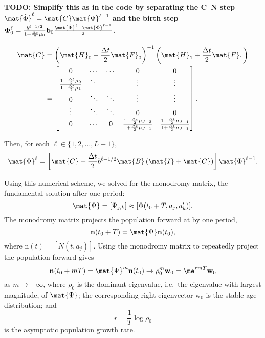 \documentclass{jpmarticle}
\renewcommand{\vec}[1]{\boldsymbol{\mathrm{#1}}}
\let\subequationsorig\subequations%
\let\endsubequationsorig\endsubequations%
\renewenvironment{subequations}{
  \subequationsorig
  \renewcommand{\theequation}{\theparentequation.\arabic{equation}}
}{
  \endsubequationsorig
}
\begin{document}
\textbf{TODO: Simplify this as in the code by separating the C–N step
  $\mat{\hat{\Phi}}^{\ell} = \mat{C} \mat{\Phi}^{\ell - 1}$
  and the birth step
  $\vec{\Phi}_0^{\ell} =
  \frac{b^{\ell - 1 / 2}}{1 + \frac{\Delta t}{2} \mu_0} \vec{b}_0
  \frac{\mat{\hat{\Phi}}^{\ell} + \mat{\hat{\Phi}}^{\ell - 1}}{2}$.}
\begin{subequations}
  \begin{align}
    \begin{split}
      \mat{C}
      &= \left(\mat{H}_0
        - \frac{\Delta t}{2} \mat{F}_0\right)^{-1}
      \left(\mat{H}_1
        + \frac{\Delta t}{2} \mat{F}_1\right)
      \\
      &=
      \begin{bmatrix}
        0 & \cdots & \cdots & 0 & 0
        \\
        \frac{1 - \frac{\Delta t}{2} \mu_0}
        {1 + \frac{\Delta t}{2} \mu_1}
        & \ddots & & \vdots & \vdots
        \\
        0 & \ddots & \ddots & \vdots & \vdots
        \\
        \vdots & \ddots & \ddots & 0 & 0
        \\
        0 & \cdots & 0 &
        \frac{1 - \frac{\Delta t}{2} \mu_{J - 2}}
        {1 + \frac{\Delta t}{2} \mu_{J - 1}}
        & \frac{1 - \frac{\Delta t}{2} \mu_{J - 1}}
        {1 + \frac{\Delta t}{2} \mu_{J - 1}}
      \end{bmatrix}.
    \end{split}
  \end{align}
\end{subequations}
Then, for each $\ell \in \{1, 2, \ldots, L - 1\}$,
\begin{equation}
  \mat{\Phi}^{\ell}
  =
  \left[\mat{C}
    +  \frac{\Delta t}{2} b^{\ell - 1 / 2} \mat{B}
    \left(\mat{I} + \mat{C}\right)
  \right]
  \mat{\Phi}^{\ell - 1}.
\end{equation}

Using this numerical scheme, we solved for the monodromy matrix, the
fundamental solution after one period:
\begin{equation}
  \mat{\Psi} = [\Psi_{j, k}] \approx [\Phi(t_0 + T, a_j, a'_k)].
\end{equation}
The monodromy matrix projects the population forward at by one period,
\begin{equation}
  \vec{n}(t_0 + T) = \mat{\Psi} \vec{n}(t_0),
\end{equation}
where $\vec{n}(t) = [N(t, a_j)]$.
Using the monodromy matrix to repeatedly project the population
forward gives
\begin{equation}
  \vec{n}(t_0 + m T)
  = \mat{\Psi}^m \vec{n}(t_0)
  \to \rho_0^m \vec{w}_0
  = \me^{r m T} \vec{w}_0
\end{equation}
as $m \to +\infty$, where $\rho_0$ is the dominant eigenvalue,
i.e.~the eigenvalue with largest magnitude, of $\mat{\Psi}$;
the corresponding right eigenvector $\vec{w}_0$ is the stable age
distribution; and
\begin{equation}
  r = \frac{1}{T} \log \rho_0
\end{equation}
is the asymptotic population growth rate.
\end{document}
